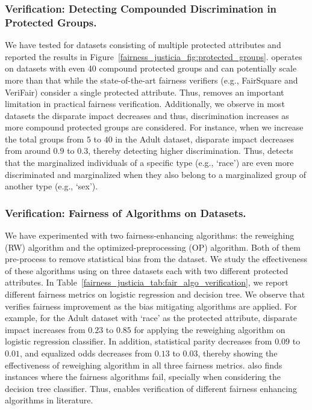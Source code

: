 \subsubsection{Verification: Detecting Compounded Discrimination in Protected Groups.}
We have tested {\justicia} for datasets consisting of multiple protected attributes and reported the results in Figure~\ref{fairness_justicia_fig:protected_groups}. {\justicia} operates on datasets with even 40 compound protected groups and can potentially scale more than that while the state-of-the-art fairness verifiers (e.g., FairSquare and VeriFair) consider a single protected attribute.
Thus, {\justicia} removes an important limitation in practical fairness verification. 
Additionally, we observe in most datasets the disparate impact decreases and thus, discrimination increases as more compound protected groups are considered. For instance, when we increase the total  groups from $ 5 $ to $ 40 $ in the Adult dataset, disparate impact decreases from around $ 0.9 $ to $ 0.3 $, thereby detecting higher discrimination. Thus, {\justicia} detects that the marginalized individuals of a specific type (e.g., `race')  are even more discriminated and marginalized when they also belong to a marginalized group of another type (e.g., `sex').

\subsubsection{Verification: Fairness of Algorithms on Datasets.}
We have experimented with two fairness-enhancing algorithms: the reweighing (RW) algorithm and the optimized-preprocessing (OP) algorithm.
Both of them pre-process to remove statistical bias from the dataset. 
We study the effectiveness of these algorithms using {\justicia} on three datasets each with two different protected attributes.  
In Table~\ref{fairness_justicia_tab:fair_algo_verification}, we report different fairness metrics on logistic regression and decision tree. We observe that {\justicia} verifies fairness improvement as the bias mitigating algorithms are applied.  For example, for the Adult dataset with `race' as the protected attribute, disparate impact increases from $ 0.23 $ to $ 0.85 $ for applying the reweighing algorithm on logistic regression classifier. In addition, statistical parity decreases from $ 0.09 $ to $ 0.01 $, and equalized odds decreases from $ 0.13 $ to $ 0.03 $, thereby showing the effectiveness of reweighing algorithm in all three fairness metrics. 
{\justicia} also finds instances where the fairness algorithms fail, specially when considering the decision tree classifier. 
Thus, {\justicia} enables verification of different fairness enhancing algorithms in literature.

